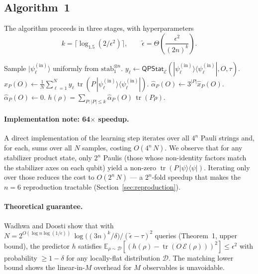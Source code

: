 \documentclass[11pt]{article}
\newcommand{\E}{\mathcal{E}}
\newcommand{\stab}{\mathrm{stab}}
\newcommand{\tr}{\operatorname{tr}}
\begin{document}
\subsection{Algorithm~1}

The algorithm proceeds in three stages, with hyperparameters
\begin{equation}
  k = \lceil \log_{1.5}(2/\epsilon^2) \rceil,
  \qquad
  \tilde{\epsilon} = \Theta\!\left(\frac{\epsilon^2}{(2n)^k}\right).
\end{equation}

\begin{algorithm}[H]
  \caption{Average-case shadow process tomography from QPSQs (paper Algorithm~1)}
  \begin{algorithmic}[1]
      \State Sample $|\psi_\ell^{(\mathrm{in})}\rangle$ uniformly from $\stab_1^{\otimes n}$.
      \State $y_\ell \leftarrow \mathsf{QPStat}_\E(|\psi_\ell^{(\mathrm{in})}\rangle\!\langle\psi_\ell^{(\mathrm{in})}|, O, \tau)$.
    \EndFor
      \State $\hat{x}_P(O) \leftarrow \frac{1}{N}\sum_{\ell=1}^N y_\ell\,\tr(P\,|\psi_\ell^{(\mathrm{in})}\rangle\!\langle\psi_\ell^{(\mathrm{in})}|)$.
        \State $\hat{\alpha}_P(O) \leftarrow 3^{|P|}\hat{x}_P(O)$.
      \Else
        \State $\hat{\alpha}_P(O) \leftarrow 0$.
      \EndIf
    \EndFor
    \State \Return $h(\rho) = \sum_{P : |P| \le k} \hat{\alpha}_P(O)\,\tr(P\rho)$.
  \end{algorithmic}
\end{algorithm}

\paragraph{Implementation note: 64$\times$ speedup.}
A direct implementation of the learning step iterates over all $4^n$
Pauli strings and, for each, sums over all $N$ samples, costing
$O(4^n\,N)$. We observe that for any stabilizer product state, only
$2^n$ Paulis (those whose non-identity factors match the stabilizer
axes on each qubit) yield a non-zero $\tr(P\,|\psi\rangle\langle\psi|)$.
Iterating only over those reduces the cost to $O(2^n\,N)$ --- a
$2^n$-fold speedup that makes the $n=6$ reproduction tractable
(Section~\ref{sec:reproduction}).

\paragraph{Theoretical guarantee.}
Wadhwa and Doosti show that with
$N = 2^{O(\log n \log(1/\epsilon))}\, \log\!\bigl((3n)^k/\delta\bigr)/(\tilde\epsilon - \tau)^2$
queries (Theorem~1, upper bound), the predictor $h$ satisfies
$\mathbb{E}_{\rho \sim \mathcal{D}}[(h(\rho) - \tr(O\,\E(\rho)))^2] \le \epsilon^2$
with probability $\ge 1 - \delta$ for any locally-flat distribution
$\mathcal{D}$. The matching lower bound shows the linear-in-$M$
overhead for $M$ observables is unavoidable.
\end{document}
